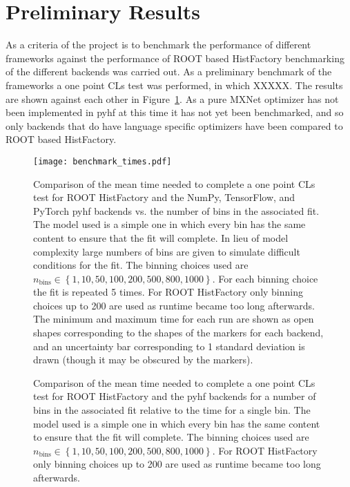 \section{Preliminary Results}\label{section:results}

As a criteria of the project is to benchmark the performance of different frameworks against the performance of ROOT based HistFactory benchmarking of the different backends was carried out.
As a preliminary benchmark of the frameworks a one point CLs test was performed, in which XXXXX.
The results are shown against each other in Figure~\ref{fig:benchmark_backends}.
As a pure MXNet optimizer has not been implemented in pyhf at this time it has not yet been benchmarked, and so only backends that do have language specific optimizers have been compared to ROOT based HistFactory.

\begin{figure}
 \centering
 \texttt{[image: benchmark\_times.pdf]}
 \caption{Comparison of the mean time needed to complete a one point CLs test for ROOT HistFactory and the NumPy, TensorFlow, and PyTorch pyhf backends vs. the number of bins in the associated fit.
  The model used is a simple one in which every bin has the same content to ensure that the fit will complete.
  In lieu of model complexity large numbers of bins are given to simulate difficult conditions for the fit.
  The binning choices used are $n_{\text{bins}} \in \left\{1, 10, 50, 100, 200, 500, 800, 1000\right\}$.
  For each binning choice the fit is repeated 5 times.
  For ROOT HistFactory only binning choices up to 200 are used as runtime became too long afterwards.
  The minimum and maximum time for each run are shown as open shapes corresponding to the shapes of the markers for each backend, and an uncertainty bar corresponding to 1 standard deviation is drawn (though it may be obscured by the markers).
 }\label{fig:benchmark_backends}
\end{figure}

\begin{figure}[htbp]
 \centering
 \hfil
 \hfil
 \caption{Comparison of the mean time needed to complete a one point CLs test for ROOT HistFactory and the pyhf backends for a number of bins in the associated fit relative to the time for a single bin.
  The model used is a simple one in which every bin has the same content to ensure that the fit will complete.
  The binning choices used are $n_{\text{bins}} \in \left\{1, 10, 50, 100, 200, 500, 800, 1000\right\}$.
  For ROOT HistFactory only binning choices up to 200 are used as runtime became too long afterwards.
 }
\end{figure}

